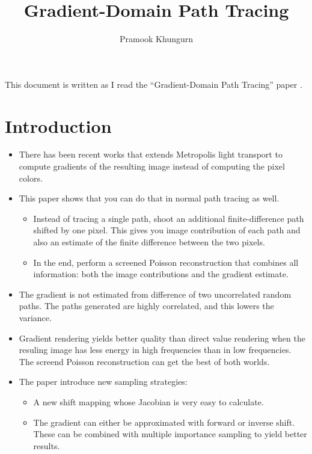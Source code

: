 \documentclass[10pt]{article}
\title{Gradient-Domain Path Tracing}
\author{Pramook Khungurn}
\begin{document}
  \maketitle

  This document is written as I read the ``Gradient-Domain Path Tracing'' paper \cite{Kettunen:2015}.

  \section{Introduction}

  \begin{itemize}
  	\item There has been recent works that extends Metropolis light transport to compute gradients of the resulting image instead of computing the pixel colors.

  	\item This paper shows that you can do that in normal path tracing as well.  
  	\begin{itemize}
  		\item Instead of tracing a single path, shoot an additional finite-difference path shifted by one pixel.  This gives you image contribution of each path and also an estimate of the finite difference between the two pixels.

  		\item In the end, perform a screened Poisson reconstruction that combines all information: both the image contributions and the gradient estimate.
  	\end{itemize}

  	\item The gradient is not estimated from difference of two uncorrelated random paths.  The paths generated are highly correlated, and this lowers the variance.

  	\item Gradient rendering yields better quality than direct value rendering when the resuling image has less energy in high frequencies than in low frequencies.  The screend Poisson reconstruction can get the best of both worlds.  	

  	\item The paper introduce new sampling strategies:
  	\begin{itemize}
  		\item A new shift mapping whose Jacobian is very easy to calculate.
  		\item The gradient can either be approximated with forward or inverse shift.  These can be combined with multiple importance sampling to yield better results.
  	\end{itemize}


\end{itemize}
\end{document}
